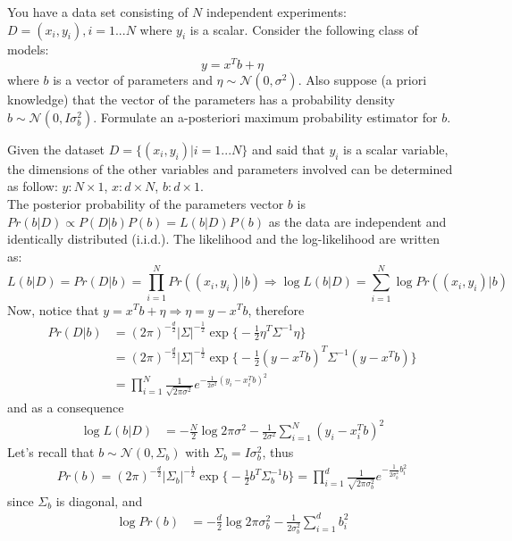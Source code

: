 \Exercise[number={4}]
You have a data set consisting of \(N\) independent experiments: 
\(D = {(x_i, y_i), i = 1...N}\) where \(y_i\) is a scalar. 
Consider the following class of models:
\[
y=x^T b + \eta
\]
where \(b\) is a vector of parameters and \(\eta\sim\mathcal{N}(0,\sigma^2)\).
Also suppose (a priori knowledge) that the vector of the 
parameters has a probability density \(b\sim\mathcal{N}(0,I\sigma_b^2)\).
Formulate an a-posteriori maximum probability estimator for \(b\).

\Answer[number={4}]
Given the dataset \(D=\{(x_i, y_i) | i=1...N\}\) and said that \(y_i\) is
a scalar variable, the dimensions of the other variables and parameters involved
can be determined as follow: \(y: N\times 1\), \(x: d\times N\), \(b: d\times 1\). \\
The posterior probability of the parameters vector \(b\) is
\(Pr(b|D)\propto P(D|b)P(b) = L(b|D)P(b)\) as the data are independent and identically
distributed (i.i.d.).
The likelihood and the log-likelihood are written as:
\[
    L(b|D) = Pr(D|b) = \prod_{i=1}^{N} Pr((x_i, y_i)|b)
    \Rightarrow
    \log{L}(b|D) = \sum_{i=1}^{N}\log{Pr((x_i, y_i)|b)}
\]
Now, notice that \(y=x^T b + \eta \Rightarrow \eta=y-x^T b\), therefore
\begin{align*}
    Pr(D|b)
    &= 
    (2\pi)^{-\frac{d}{2}}|\Sigma|^{-\frac{1}{2}}\exp{\biggl\{ -\frac{1}{2}\eta^T\Sigma^{-1}\eta \biggr\}} \\
    &=
    (2\pi)^{-\frac{d}{2}}|\Sigma|^{-\frac{1}{2}}\exp{\biggl\{ -\frac{1}{2}(y-x^T b)^T\Sigma^{-1}(y-x^T b) \biggr\}} \\
    &= \prod_{i=1}^{N} \frac{1}{\sqrt{2\pi\sigma^2}} e^{-\frac{1}{2\sigma^2}(y_i-x_i^T b)^2}
\end{align*}
and as a consequence
\begin{align*}
    \log{L}(b|D)
    &=
    -\frac{N}{2}\log{2\pi\sigma^2}-\frac{1}{2\sigma^2}\sum_{i=1}^{N}(y_i-x_i^T b)^2
\end{align*}
Let's recall that \(b \sim \mathcal{N}(0, \Sigma_b)\) with \(\Sigma_b = I\sigma_b^2\), thus
\begin{align*}
    Pr(b)=(2\pi)^{-\frac{d}{2}}|\Sigma_b|^{-\frac{1}{2}}\exp{\biggl\{ -\frac{1}{2}b^T\Sigma_b^{-1}b \biggr\}}
    =
    \prod_{i=1}^{d} \frac{1}{\sqrt{2\pi\sigma_b^2}} e^{-\frac{1}{2\sigma_b^2}b_i^2}
\end{align*}
since \(\Sigma_b\) is diagonal, and
\begin{align*}
    \log{Pr}(b)
    &=
    -\frac{d}{2}\log{2\pi\sigma_b^2}-\frac{1}{2\sigma_b^2}\sum_{i=1}^{d}b_i^2
\end{align*}
